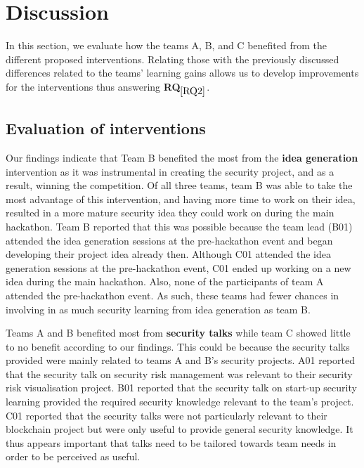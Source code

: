 \documentclass[runningheads]{llncs}
\newcommand{\hr}[1]{\textbf{RQ}$_{\ref{#1}}$}
\begin{document}
\section{Discussion}
In this section, we evaluate how the teams A, B, and C benefited from the different proposed interventions. Relating those with the previously discussed differences related to the teams' learning gains allows us to develop improvements for the interventions thus answering \hr{RQ2}.

\subsection{Evaluation of interventions} \label{evalintervention}
Our findings indicate that Team B benefited the most from the \textbf{idea generation} intervention as it was instrumental in creating the security project, and as a result, winning the competition. Of all three teams, team B was able to take the most advantage of this intervention, and having more time to work on their idea, resulted in a more mature security idea they could work on during the main hackathon. Team B reported that this was possible because the team lead (B01) attended the idea generation sessions at the pre-hackathon event and began developing their project idea already then.
Although C01 attended the idea generation sessions at the pre-hackathon event, C01 ended up working on a new idea during the main hackathon. Also, none of the participants of team A attended the pre-hackathon event.
As such, these teams had fewer chances in involving in as much security learning from idea generation as team B.


Teams A and B benefited most from \textbf{security talks} while team C showed little to no benefit according to our findings. This could be because the security talks provided were mainly related to teams A and B's security projects. 
A01 reported that the security talk on security risk management was relevant to their security risk visualisation project. B01 reported that the security talk on start-up security learning provided the required security knowledge relevant to the team's project.
C01 reported that the security talks were not particularly relevant to their blockchain project but were only useful to provide general security knowledge. It thus appears important that talks need to be tailored towards team needs in order to be perceived as useful.
\end{document}
